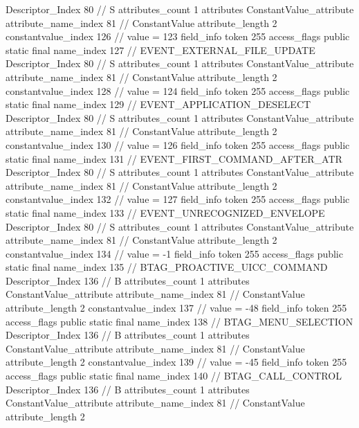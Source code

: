 {{{{{				Descriptor_Index	80		// S
				attributes_count	1
				attributes {
				ConstantValue_attribute {
					attribute_name_index	81		// ConstantValue
					attribute_length	2
					constantvalue_index	126		// value = 123
				}
				}
			}
			field_info {
				token	255
				access_flags	public static final
				name_index	127		// EVENT_EXTERNAL_FILE_UPDATE
				Descriptor_Index	80		// S
				attributes_count	1
				attributes {
				ConstantValue_attribute {
					attribute_name_index	81		// ConstantValue
					attribute_length	2
					constantvalue_index	128		// value = 124
				}
				}
			}
			field_info {
				token	255
				access_flags	public static final
				name_index	129		// EVENT_APPLICATION_DESELECT
				Descriptor_Index	80		// S
				attributes_count	1
				attributes {
				ConstantValue_attribute {
					attribute_name_index	81		// ConstantValue
					attribute_length	2
					constantvalue_index	130		// value = 126
				}
				}
			}
			field_info {
				token	255
				access_flags	public static final
				name_index	131		// EVENT_FIRST_COMMAND_AFTER_ATR
				Descriptor_Index	80		// S
				attributes_count	1
				attributes {
				ConstantValue_attribute {
					attribute_name_index	81		// ConstantValue
					attribute_length	2
					constantvalue_index	132		// value = 127
				}
				}
			}
			field_info {
				token	255
				access_flags	public static final
				name_index	133		// EVENT_UNRECOGNIZED_ENVELOPE
				Descriptor_Index	80		// S
				attributes_count	1
				attributes {
				ConstantValue_attribute {
					attribute_name_index	81		// ConstantValue
					attribute_length	2
					constantvalue_index	134		// value = -1
				}
				}
			}
			field_info {
				token	255
				access_flags	public static final
				name_index	135		// BTAG_PROACTIVE_UICC_COMMAND
				Descriptor_Index	136		// B
				attributes_count	1
				attributes {
				ConstantValue_attribute {
					attribute_name_index	81		// ConstantValue
					attribute_length	2
					constantvalue_index	137		// value = -48
				}
				}
			}
			field_info {
				token	255
				access_flags	public static final
				name_index	138		// BTAG_MENU_SELECTION
				Descriptor_Index	136		// B
				attributes_count	1
				attributes {
				ConstantValue_attribute {
					attribute_name_index	81		// ConstantValue
					attribute_length	2
					constantvalue_index	139		// value = -45
				}
				}
			}
			field_info {
				token	255
				access_flags	public static final
				name_index	140		// BTAG_CALL_CONTROL
				Descriptor_Index	136		// B
				attributes_count	1
				attributes {
				ConstantValue_attribute {
					attribute_name_index	81		// ConstantValue
					attribute_length	2
}}}}}}}
